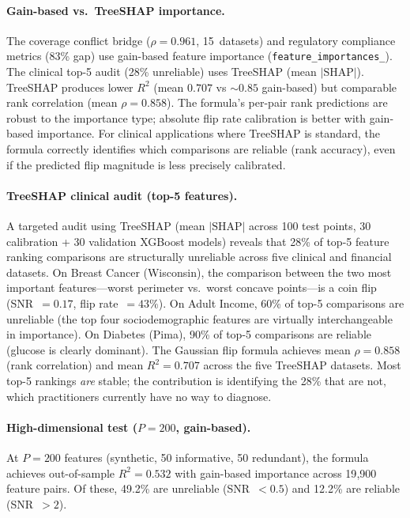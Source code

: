\documentclass[11pt,a4paper]{article}
\begin{document}
\paragraph{Gain-based vs.\ TreeSHAP importance.}
The coverage conflict bridge ($\rho = 0.961$, 15~datasets) and regulatory compliance metrics (83\% gap) use gain-based feature importance (\texttt{feature\_importances\_}).  The clinical top-5 audit (28\% unreliable) uses TreeSHAP (mean $|\text{SHAP}|$).  TreeSHAP produces lower $R^2$ (mean $0.707$ vs $\sim 0.85$ gain-based) but comparable rank correlation (mean $\rho = 0.858$).  The formula's per-pair rank predictions are robust to the importance type; absolute flip rate calibration is better with gain-based importance.  For clinical applications where TreeSHAP is standard, the formula correctly identifies which comparisons are reliable (rank accuracy), even if the predicted flip magnitude is less precisely calibrated.

\paragraph{TreeSHAP clinical audit (top-5 features).}
A targeted audit using TreeSHAP (mean $|\text{SHAP}|$ across 100 test points, 30 calibration + 30 validation XGBoost models) reveals that 28\% of top-5 feature ranking comparisons are structurally unreliable across five clinical and financial datasets.  On Breast Cancer (Wisconsin), the comparison between the two most important features---worst perimeter vs.\ worst concave points---is a coin flip (SNR~$= 0.17$, flip rate~$= 43\%$).  On Adult Income, 60\% of top-5 comparisons are unreliable (the top four sociodemographic features are virtually interchangeable in importance).  On Diabetes (Pima), 90\% of top-5 comparisons are reliable (glucose is clearly dominant).  The Gaussian flip formula achieves mean $\rho = 0.858$ (rank correlation) and mean $R^2 = 0.707$ across the five TreeSHAP datasets.  Most top-5 rankings \emph{are} stable; the contribution is identifying the 28\% that are not, which practitioners currently have no way to diagnose.

\paragraph{High-dimensional test ($P = 200$, gain-based).}
At $P = 200$ features (synthetic, 50 informative, 50 redundant), the formula
achieves out-of-sample $R^2 = 0.532$ with gain-based importance across
19{,}900 feature pairs.  Of these, 49.2\% are unreliable (SNR~$< 0.5$) and
12.2\% are reliable (SNR~$> 2$).
\end{document}
